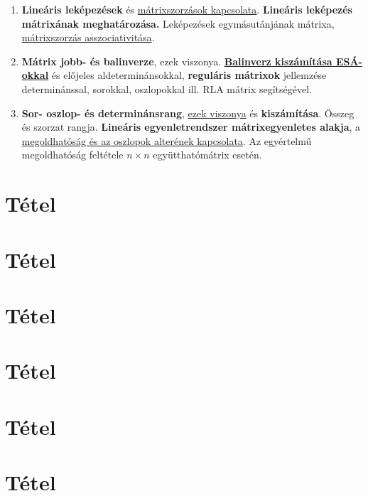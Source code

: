 \documentclass[10pt]{article}
\begin{document}
\begin{enumerate}
            \item \textbf{Lineáris leképezések} és \underline{mátrixszorzások kapcsolata}. \textbf{Lineáris leképezés mátrixának meghatározása.} Leképezések egymásutánjának mátrixa, \underline{mátrixszorzás asszociativitása}.
            \item \textbf{Mátrix jobb- és balinverze}, ezek viszonya. \textbf{\underline{Balinverz kiszámítása ESÁ-okkal}} és előjeles aldeterminánsokkal, \textbf{reguláris mátrixok} jellemzése determinánssal, sorokkal, oszlopokkal ill. RLA mátrix segítségével.
            \item \textbf{Sor- oszlop- és determinánsrang}, \underline{ezek viszonya} és \textbf{kiszámítása}. Összeg és szorzat rangja. \textbf{Lineáris egyenletrendszer mátrixegyenletes alakja}, a \underline{megoldhatóság és az oszlopok alterének kapcsolata}. Az egyértelmű megoldhatóság feltétele $n \times n$ együtthatómátrix esetén.
        \end{enumerate}

	\section{Tétel}
		
		

	\section{Tétel}
		
		
		
	\section{Tétel}
		
		

	\section{Tétel}
		
		

	\section{Tétel}
		
		

	\section{Tétel}
		
\end{document}
